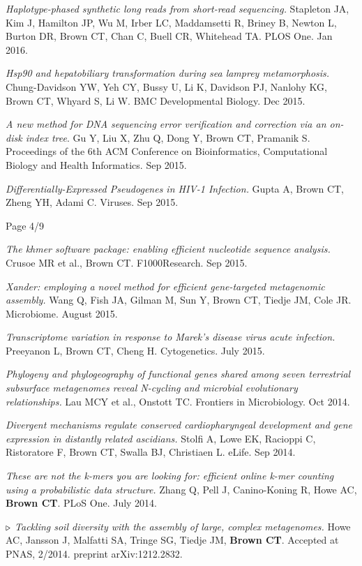 \documentclass[margin,line]{resume}
\begin{document}
\begin{resume}
{\em Haplotype-phased synthetic long reads from short-read sequencing.} Stapleton JA, Kim J, Hamilton JP, Wu M, Irber LC, Maddamsetti R, Briney B, Newton L, Burton DR, Brown CT, Chan C, Buell CR, Whitehead TA. PLOS One. Jan 2016.

{\em Hsp90 and hepatobiliary transformation during sea lamprey metamorphosis.}
Chung-Davidson YW, Yeh CY, Bussy U, Li K, Davidson PJ, Nanlohy KG, Brown CT, Whyard S, Li W. BMC Developmental Biology. Dec 2015.

{\em A new method for DNA sequencing error verification and correction via an on-disk index tree}. Gu Y, Liu X, Zhu Q, Dong Y, Brown CT, Pramanik S.  Proceedings of the 6th ACM Conference on Bioinformatics, Computational Biology and Health Informatics. Sep 2015.

{\em Differentially-Expressed Pseudogenes in HIV-1 Infection.} Gupta A, Brown CT, Zheng YH, Adami C. Viruses. Sep 2015.

\vspace{1cm}
{\centerline {Page 4/9}}

\newpage

{\em The khmer software package: enabling efficient nucleotide sequence analysis.} Crusoe MR et al., Brown CT. F1000Research. Sep 2015.

{\em Xander: employing a novel method for efficient gene-targeted metagenomic assembly.} Wang Q, Fish JA, Gilman M, Sun Y, Brown CT, Tiedje JM, Cole JR. Microbiome. August 2015.

{\em Transcriptome variation in response to Marek’s disease virus acute infection.} Preeyanon L, Brown CT, Cheng H. Cytogenetics. July 2015.

{\em Phylogeny and phylogeography of functional genes shared among seven terrestrial subsurface metagenomes reveal N-cycling and microbial evolutionary relationships.} Lau MCY et al., Onstott TC. Frontiers in Microbiology. Oct 2014.

{\em Divergent mechanisms regulate conserved cardiopharyngeal development and gene expression in distantly related ascidians.} Stolfi A, Lowe EK, Racioppi C, Ristoratore F, Brown CT, Swalla BJ, Christiaen L. eLife. Sep 2014.

{\em These are not the k-mers you are looking for: efficient online
  k-mer counting using a probabilistic data structure.} Zhang Q, Pell
J, Canino-Koning R, Howe AC, {\bf Brown CT}.  PLoS One. July 2014.

{\color{red} ${\bf \triangleright}$}
{\em Tackling soil diversity with the assembly of large, complex metagenomes.}
Howe AC, Jansson J, Malfatti SA, Tringe SG, Tiedje JM, {\bf Brown CT}. Accepted at PNAS, 2/2014.  preprint arXiv:1212.2832.


\end{resume}
\end{document}
